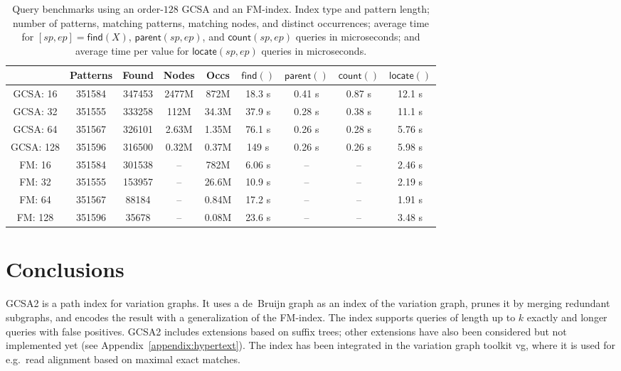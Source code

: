 \documentclass[a4paper,11pt]{llncs}
\newcommand{\find}{\ensuremath{\mathsf{find}}}
\newcommand{\locate}{\ensuremath{\mathsf{locate}}}
\newcommand{\parent}{\ensuremath{\mathsf{parent}}}
\newcommand{\countq}{\ensuremath{\mathsf{count}}}
\newcommand{\orderk}[1]{order\nobreakdash-$#1$}
\begin{document}
\begin{table}[t!]
\begin{center}
\caption{Query benchmarks using an \orderk{128} GCSA and an FM\nobreakdash-index. Index type and pattern length; number of patterns, matching patterns, matching nodes, and distinct occurrences; average time for $[sp, ep] = \find(X)$, $\parent(sp, ep)$, and $\countq(sp, ep)$ queries in microseconds; and average time per value for $\locate(sp, ep)$ queries in microseconds.}\label{table:benchmark}
\begin{tabular}{c|cccc|cccc}
\hline
 & \textbf{Patterns} & \textbf{Found} & \textbf{Nodes} & \textbf{Occs} & $\find()$ & $\parent()$ & $\countq()$ & $\locate()$ \\
\hline
GCSA:  16 & 351584 & 347453 & 2477M &  872M & 18.3 \textmu{}s & 0.41 \textmu{}s & 0.87 \textmu{}s & 12.1 \textmu{}s \\
GCSA:  32 & 351555 & 333258 &  112M & 34.3M & 37.9 \textmu{}s & 0.28 \textmu{}s & 0.38 \textmu{}s & 11.1 \textmu{}s \\
GCSA:  64 & 351567 & 326101 & 2.63M & 1.35M & 76.1 \textmu{}s & 0.26 \textmu{}s & 0.28 \textmu{}s & 5.76 \textmu{}s \\
GCSA: 128 & 351596 & 316500 & 0.32M & 0.37M &  149 \textmu{}s & 0.26 \textmu{}s & 0.26 \textmu{}s & 5.98 \textmu{}s \\
\hline
FM:    16 & 351584 & 301538 &    -- &  782M & 6.06 \textmu{}s &              -- &              -- & 2.46 \textmu{}s \\
FM:    32 & 351555 & 153957 &    -- & 26.6M & 10.9 \textmu{}s &              -- &              -- & 2.19 \textmu{}s \\
FM:    64 & 351567 &  88184 &    -- & 0.84M & 17.2 \textmu{}s &              -- &              -- & 1.91 \textmu{}s \\
FM:   128 & 351596 &  35678 &    -- & 0.08M & 23.6 \textmu{}s &              -- &              -- & 3.48 \textmu{}s \\
\hline
\end{tabular}
\end{center}
\end{table}


\section{Conclusions}

GCSA2 is a path index for variation graphs. It uses a de~Bruijn graph as an index of the variation graph, prunes it by merging redundant subgraphs, and encodes the result with a generalization of the FM\nobreakdash-index. The index supports queries of length up to $k$ exactly and longer queries with false positives. GCSA2 includes extensions based on suffix trees; other extensions have also been considered but not implemented yet (see Appendix~\ref{appendix:hypertext}). The index has been integrated in the variation graph toolkit vg, where it is used for e.g.~read alignment based on maximal exact matches.
\end{document}
